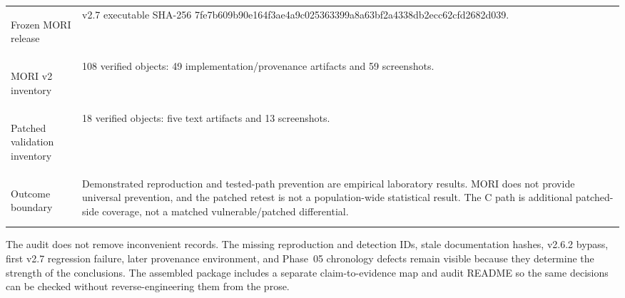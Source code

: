 \begin{table}[H]
\begin{tabularx}{\textwidth}{@{}>{\bfseries\raggedright\arraybackslash}p{}Y@{}}
        Frozen MORI release & v2.7 executable SHA-256 {\scriptsize\ttfamily 7fe7b609b90e164f3ae4a9c025363399a8a63bf2a4338db2ecc62cfd2682d039}. \\
        MORI v2 inventory & 108 verified objects: 49 implementation/provenance artifacts and 59 screenshots. \\
        Patched validation inventory & 18 verified objects: five text artifacts and 13 screenshots. \\
        Outcome boundary & Demonstrated reproduction and tested-path prevention are empirical laboratory results. MORI does not provide universal prevention, and the patched retest is not a population-wide statistical result. The C path is additional patched-side coverage, not a matched vulnerable/patched differential. \\
        \bottomrule
    \end{tabularx}
\end{table}

The audit does not remove inconvenient records. The missing reproduction and
detection IDs, stale documentation hashes, v2.6.2 bypass, first v2.7 regression
failure, later provenance environment, and Phase~05 chronology defects remain
visible because they determine the strength of the conclusions. The assembled
package includes a separate claim-to-evidence map and audit README so the same
decisions can be checked without reverse-engineering them from the prose.